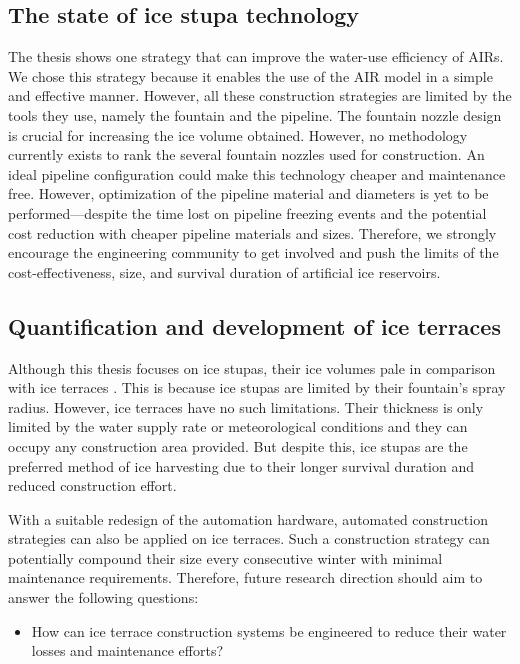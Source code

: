 \subsection{The state of ice stupa technology}

The thesis shows one strategy that can improve the water-use efficiency of AIRs. We chose this strategy because
it enables the use of the AIR model in a simple and effective manner. However, all these construction strategies
are limited by the tools they use, namely the fountain and the pipeline. The fountain nozzle design is crucial
for increasing the ice volume obtained. However, no methodology currently exists to rank the several fountain
nozzles used for construction. An ideal pipeline configuration could make this technology cheaper and
maintenance free. However, optimization of the pipeline material and diameters is yet to be performed---despite
the time lost on pipeline freezing events and the potential cost reduction with cheaper pipeline materials and
sizes. Therefore, we strongly encourage the engineering community to get involved and push the limits of the
cost-effectiveness, size, and survival duration of artificial ice reservoirs.

\subsection{Quantification and development of ice terraces}

Although this thesis focuses on ice stupas, their ice volumes pale in comparison with ice terraces
\citep{nusserSociohydrologyArtificialGlaciers2019}. This is because ice stupas are limited by their fountain's
spray radius. However, ice terraces have no such limitations. Their thickness is only limited by the water
supply rate or meteorological conditions and they can occupy any construction area provided. But despite this, ice
stupas are the preferred method of ice harvesting due to their longer survival duration and reduced construction
effort.

With a suitable redesign of the automation hardware, automated construction strategies can also be applied on
ice terraces. Such a construction strategy can potentially compound their size every consecutive winter with
minimal maintenance requirements. Therefore, future research direction should aim to answer the following
questions:

\begin{itemize}

	\item How can ice terrace construction systems be engineered to reduce their water losses and maintenance
	      efforts?

\end{itemize}

